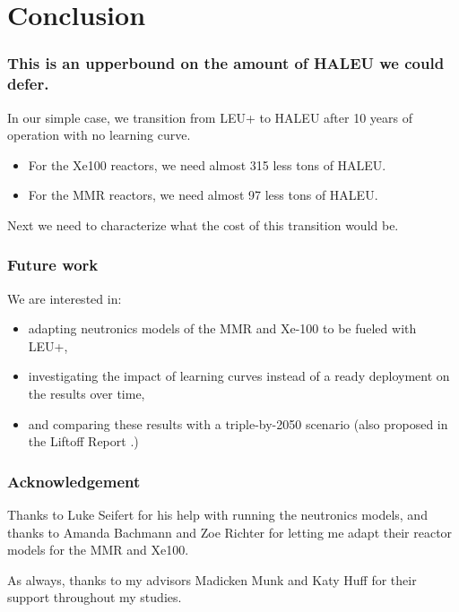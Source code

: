 \documentclass[9pt]{beamer}
\begin{document}
  \section{Conclusion}
  \begin{frame}
      \frametitle{This is an upperbound on the amount of HALEU we could defer.}
      In our simple case, we transition from LEU+ to HALEU after 10 years of operation with no learning curve.
      \begin{itemize}
          \item For the Xe100 reactors, we need almost 315 less tons of HALEU.
          \item For the MMR reactors, we need almost 97 less tons of HALEU.
      \end{itemize}
      Next we need to characterize what the cost of this transition would be.
  \end{frame}

  \begin{frame}
    \frametitle{Future work}
    We are interested in:
    \begin{itemize}
      \item adapting neutronics models of the MMR and Xe-100 to be fueled with LEU+,
      \item investigating the impact of learning curves instead of a ready deployment on the results over time,
      \item and comparing these results with a triple-by-2050 scenario (also proposed in the Liftoff Report \cite{julie_liftoff_pathways_2024}.)
    \end{itemize}
  \end{frame}


  \begin{frame}
    \frametitle{Acknowledgement}


      Thanks to Luke Seifert for his help with running the neutronics models, and thanks to Amanda Bachmann and Zoe Richter for letting me adapt their reactor models for the MMR and Xe100.

      \vspace{7mm}
      As always, thanks to my advisors Madicken Munk and Katy Huff for their support throughout my studies.
  \end{frame}
\end{document}
